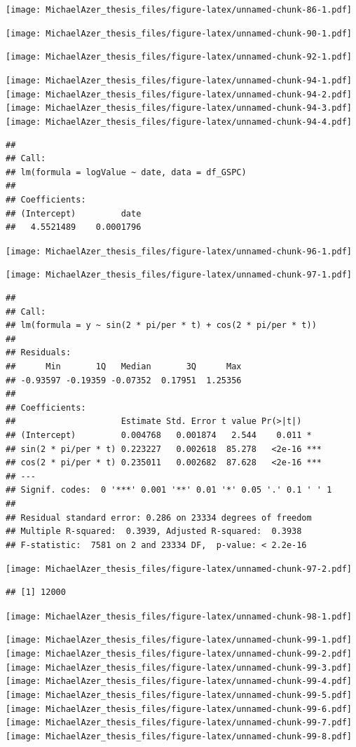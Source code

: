 \documentclass[]{book}
\begin{document}
\texttt{[image: MichaelAzer\_thesis\_files/figure-latex/unnamed-chunk-86-1.pdf]}

\texttt{[image: MichaelAzer\_thesis\_files/figure-latex/unnamed-chunk-90-1.pdf]}

\texttt{[image: MichaelAzer\_thesis\_files/figure-latex/unnamed-chunk-92-1.pdf]}

\texttt{[image: MichaelAzer\_thesis\_files/figure-latex/unnamed-chunk-94-1.pdf]} \texttt{[image: MichaelAzer\_thesis\_files/figure-latex/unnamed-chunk-94-2.pdf]} \texttt{[image: MichaelAzer\_thesis\_files/figure-latex/unnamed-chunk-94-3.pdf]} \texttt{[image: MichaelAzer\_thesis\_files/figure-latex/unnamed-chunk-94-4.pdf]}

\begin{verbatim}
## 
## Call:
## lm(formula = logValue ~ date, data = df_GSPC)
## 
## Coefficients:
## (Intercept)         date  
##   4.5521489    0.0001796
\end{verbatim}

\texttt{[image: MichaelAzer\_thesis\_files/figure-latex/unnamed-chunk-96-1.pdf]}

\texttt{[image: MichaelAzer\_thesis\_files/figure-latex/unnamed-chunk-97-1.pdf]}

\begin{verbatim}
## 
## Call:
## lm(formula = y ~ sin(2 * pi/per * t) + cos(2 * pi/per * t))
## 
## Residuals:
##      Min       1Q   Median       3Q      Max 
## -0.93597 -0.19359 -0.07352  0.17951  1.25356 
## 
## Coefficients:
##                     Estimate Std. Error t value Pr(>|t|)    
## (Intercept)         0.004768   0.001874   2.544    0.011 *  
## sin(2 * pi/per * t) 0.223227   0.002618  85.278   <2e-16 ***
## cos(2 * pi/per * t) 0.235011   0.002682  87.628   <2e-16 ***
## ---
## Signif. codes:  0 '***' 0.001 '**' 0.01 '*' 0.05 '.' 0.1 ' ' 1
## 
## Residual standard error: 0.286 on 23334 degrees of freedom
## Multiple R-squared:  0.3939, Adjusted R-squared:  0.3938 
## F-statistic:  7581 on 2 and 23334 DF,  p-value: < 2.2e-16
\end{verbatim}

\texttt{[image: MichaelAzer\_thesis\_files/figure-latex/unnamed-chunk-97-2.pdf]}

\begin{verbatim}
## [1] 12000
\end{verbatim}

\texttt{[image: MichaelAzer\_thesis\_files/figure-latex/unnamed-chunk-98-1.pdf]}

\texttt{[image: MichaelAzer\_thesis\_files/figure-latex/unnamed-chunk-99-1.pdf]} \texttt{[image: MichaelAzer\_thesis\_files/figure-latex/unnamed-chunk-99-2.pdf]} \texttt{[image: MichaelAzer\_thesis\_files/figure-latex/unnamed-chunk-99-3.pdf]} \texttt{[image: MichaelAzer\_thesis\_files/figure-latex/unnamed-chunk-99-4.pdf]} \texttt{[image: MichaelAzer\_thesis\_files/figure-latex/unnamed-chunk-99-5.pdf]} \texttt{[image: MichaelAzer\_thesis\_files/figure-latex/unnamed-chunk-99-6.pdf]} \texttt{[image: MichaelAzer\_thesis\_files/figure-latex/unnamed-chunk-99-7.pdf]} \texttt{[image: MichaelAzer\_thesis\_files/figure-latex/unnamed-chunk-99-8.pdf]}
\end{document}
